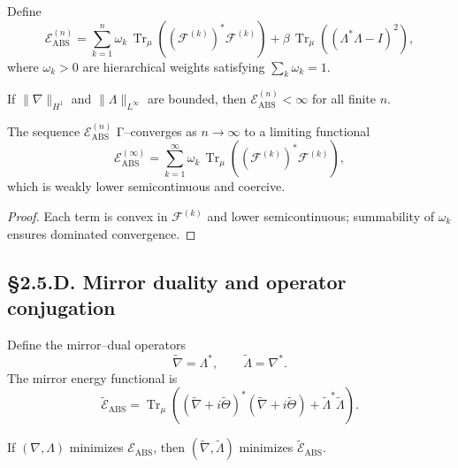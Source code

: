 \begin{definition}
Define
\[
\mathcal{E}_{\mathrm{ABS}}^{(n)}
=\sum_{k=1}^n \omega_k\,\operatorname{Tr}_\mu\!\left((\mathcal{F}^{(k)})^\ast \mathcal{F}^{(k)}\right)
+\beta\,\operatorname{Tr}_\mu\!\left((\Lambda^\ast\Lambda-I)^2\right),
\]
where $\omega_k>0$ are hierarchical weights satisfying $\sum_k \omega_k=1$.
\end{definition}

\begin{lemma}[Boundedness]
If $\|\nabla\|_{H^1}$ and $\|\Lambda\|_{L^\infty}$ are bounded, then $\mathcal{E}_{\mathrm{ABS}}^{(n)}<\infty$ for all finite $n$.
\end{lemma}

\begin{theorem}\label{thm:2.5.gamma}
The sequence $\mathcal{E}_{\mathrm{ABS}}^{(n)}$ Γ–converges as $n\to\infty$ to a limiting functional
\[
\mathcal{E}_{\mathrm{ABS}}^{(\infty)}
= \sum_{k=1}^\infty \omega_k\,\operatorname{Tr}_\mu((\mathcal{F}^{(k)})^\ast\mathcal{F}^{(k)}),
\]
which is weakly lower semicontinuous and coercive.
\end{theorem}

\begin{proof}
Each term is convex in $\mathcal{F}^{(k)}$ and lower semicontinuous; summability of $\omega_k$ ensures dominated convergence.
\end{proof}

\subsection*{§2.5.D. Mirror duality and operator conjugation}

\begin{definition}
Define the mirror–dual operators
\[
\widetilde{\nabla}=\Lambda^\ast,\qquad \widetilde{\Lambda}=\nabla^\ast.
\]
The mirror energy functional is
\[
\widetilde{\mathcal{E}}_{\mathrm{ABS}}=\operatorname{Tr}_\mu\!\left(
(\widetilde{\nabla}+i\widetilde{\Theta})^\ast(\widetilde{\nabla}+i\widetilde{\Theta})
+\widetilde{\Lambda}^\ast\widetilde{\Lambda}
\right).
\]
\end{definition}

\begin{theorem}\label{thm:2.5.mirror}
If $(\nabla,\Lambda)$ minimizes $\mathcal{E}_{\mathrm{ABS}}$, then $(\widetilde{\nabla},\widetilde{\Lambda})$ minimizes $\widetilde{\mathcal{E}}_{\mathrm{ABS}}$.
\end{theorem}


